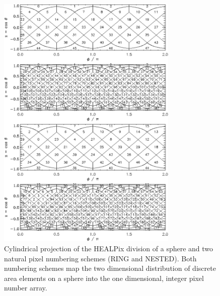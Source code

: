 \begin{figure} [!ht]
\begin{center}
\centerline{\includegraphics[height=12.5cm]{images/healpix2d.pdf}}
\caption[Cylindrical projection]%
{\label{fig:healpix_numbering}%
Cylindrical projection of the HEALPix division of a
sphere and two natural pixel numbering schemes (RING and NESTED). 
Both numbering schemes map the two dimensional 
distribution
of discrete area elements on a sphere into the one dimensional, 
integer pixel number array.
}
\end{center}
\end{figure}